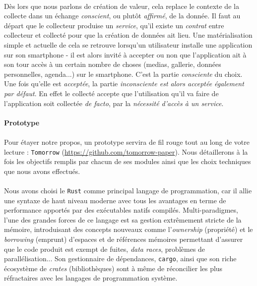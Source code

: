 \paragraph{} Dès lors que nous parlons de création de valeur, cela replace le contexte de la collecte dans un échange
\emph{conscient}, ou plutôt \emph{affirmé}, de la donnée. Il faut au départ que le collecteur produise un \emph{service},
qu'il existe un \emph{contrat} entre collecteur et collecté pour que la création de données ait lieu. Une matérialisation
simple et actuelle de cela se retrouve lorsqu'un utilisateur installe une application sur son smartphone - il est
alors invité à accepter ou non que l'application ait à son tour accès à un certain nombre de choses (medias, gallerie,
données personnelles, agenda...) sur le smartphone. C'est la partie \emph{consciente} du choix. Une fois qu'elle est
\emph{acceptée}, la partie \emph{inconsciente est alors acceptée également par défaut}. En effet le collecté accepte que
l'utilisation qu'il va faire de l'application soit collectée \emph{de facto}, par la \emph{nécessité d'accès à un service}.

\paragraph{Prototype}
\label{prototype_recuperator}

\paragraph{} Pour étayer notre propos, un prototype servira de fil rouge tout au long de votre lecture : \lstinline{Tomorrow}
(\url{https://github.com/tomorrow-paper}). Nous détaillerons à la fois les objectifs remplis par chacun de ses modules
ainsi que les choix techniques que nous avons effectués.

\paragraph{} Nous avons choisi le \lstinline{Rust} \cite{Rust0} comme principal langage de programmation, car il allie une syntaxe
de haut niveau moderne avec tous les avantages en terme de performance apportés par des exécutables natifs compilés.
Multi-paradigmes, l'une des grandes forces de ce langage est sa gestion extrêmement stricte de la mémoire, introduisant
des concepts nouveaux comme l'\emph{ownership} (propriété) et le \emph{borrowing} (emprunt) d'espaces et de références 
mémoires permettant d'assurer que le code produit est exempt de fuites, \emph{data races}, problèmes de parallélisation...
Son gestionnaire de dépendances, \lstinline{cargo}, ainsi que son riche écosystème de \emph{crates} (bibliothèques) sont
à même de réconcilier les plus réfractaires avec les langages de programmation système.

